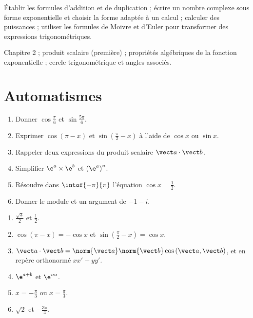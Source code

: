 
\begin{objectives}
Établir les formules d'addition et de duplication ; écrire un nombre complexe sous forme exponentielle et choisir la forme adaptée à un calcul ; calculer des puissances ; utiliser les formules de Moivre et d'Euler pour transformer des expressions trigonométriques.
\end{objectives}
\begin{prerequisites}
Chapitre 2 ; produit scalaire (première) ; propriétés algébriques de la fonction exponentielle ; cercle trigonométrique et angles associés.
\end{prerequisites}

\section{Automatismes}
\begin{fluency}
\begin{enumerate}
\item Donner $\cos\frac\pi6$ et $\sin\frac{5\pi}6$.
\item Exprimer $\cos(\pi-x)$ et $\sin\left(\frac\pi2-x\right)$ à l'aide de $\cos x$ ou $\sin x$.
\item Rappeler deux expressions du produit scalaire $\vect a\cdot\vect b$.
\item Simplifier $\e^{a}\times\e^{b}$ et $\left(\e^{a}\right)^n$.
\item Résoudre dans $\intof{-\pi}{\pi}$ l'équation $\cos x=\frac12$.
\item Donner le module et un argument de $-1-i$.
\end{enumerate}
\end{fluency}
\begin{solution}[Automatismes]
\begin{enumerate}
\item $\frac{\sqrt3}2$ et $\frac12$.
\item $\cos(\pi-x)=-\cos x$ et $\sin\left(\frac\pi2-x\right)=\cos x$.
\item $\vect a\cdot\vect b=\norm{\vect a}\norm{\vect b}\cos\left(\vect a,\vect b\right)$, et en repère orthonormé $xx'+yy'$.
\item $\e^{a+b}$ et $\e^{na}$.
\item $x=-\frac\pi3$ ou $x=\frac\pi3$.
\item $\sqrt2$ et $-\frac{3\pi}4$.
\end{enumerate}
\end{solution}

